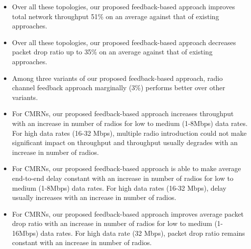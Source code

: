 \begin{itemize}
    \item Over all these topologies, our proposed feedback-based approach improves total network throughput 51\% on an average against that of existing approaches.
    \item Over all these topologies, our proposed feedback-based approach decreases packet drop ratio up to 35\% on an average against that of existing approaches.
    \item Among three variants of our proposed feedback-based approach, radio channel feedback approach marginally (3\%) performs better over other variants.
    \item For CMRNs, our proposed feedback-based approach increases throughput with an increase in number of radios for low to medium (1-8Mbps) data rates. For high data rates (16-32 Mbps), multiple radio introduction could not make significant impact on throughput and throughput usually degrades with an increase in number of radios.
    \item For CMRNs, our proposed feedback-based approach is able to make average end-to-end delay constant with an increase in number of radios for low to medium (1-8Mbps) data rates. For high data rates (16-32 Mbps), delay usually increases with an increase in number of radios.
    \item For CMRNs, our proposed feedback-based approach improves average packet drop ratio with an increase in number of radios for low to medium (1-16Mbps) data rates. For high data rate (32 Mbps), packet drop ratio remains constant with an increase in number of radios.
\end{itemize}

\endinput
